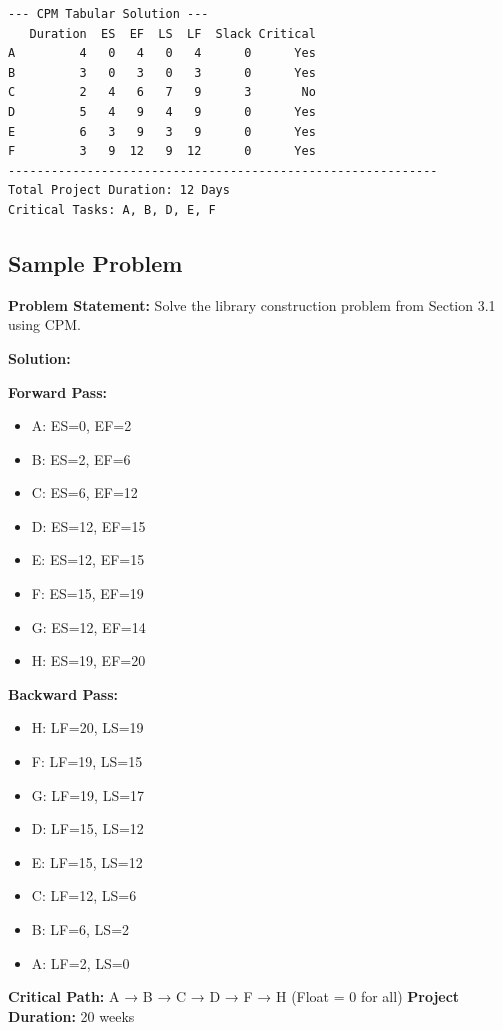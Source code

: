 \documentclass[
  letterpaper,
  DIV=11,
  numbers=noendperiod]{scrreprt}
\providecommand{\tightlist}{%
  \setlength{\itemsep}{0pt}\setlength{\parskip}{0pt}}
\begin{document}
\begin{verbatim}
--- CPM Tabular Solution ---
   Duration  ES  EF  LS  LF  Slack Critical
A         4   0   4   0   4      0      Yes
B         3   0   3   0   3      0      Yes
C         2   4   6   7   9      3       No
D         5   4   9   4   9      0      Yes
E         6   3   9   3   9      0      Yes
F         3   9  12   9  12      0      Yes
------------------------------------------------------------
Total Project Duration: 12 Days
Critical Tasks: A, B, D, E, F
\end{verbatim}

\subsection{Sample Problem}\label{sample-problem-8}

\textbf{Problem Statement:} Solve the library construction problem from
Section 3.1 using CPM.

\textbf{Solution:}

\textbf{Forward Pass:}

\begin{itemize}
\tightlist
\item
  A: ES=0, EF=2
\item
  B: ES=2, EF=6
\item
  C: ES=6, EF=12
\item
  D: ES=12, EF=15
\item
  E: ES=12, EF=15
\item
  F: ES=15, EF=19
\item
  G: ES=12, EF=14
\item
  H: ES=19, EF=20
\end{itemize}

\textbf{Backward Pass:}

\begin{itemize}
\tightlist
\item
  H: LF=20, LS=19
\item
  F: LF=19, LS=15
\item
  G: LF=19, LS=17
\item
  D: LF=15, LS=12
\item
  E: LF=15, LS=12
\item
  C: LF=12, LS=6
\item
  B: LF=6, LS=2
\item
  A: LF=2, LS=0
\end{itemize}

\textbf{Critical Path:} A → B → C → D → F → H (Float = 0 for all)
\textbf{Project Duration:} 20 weeks
\end{document}

